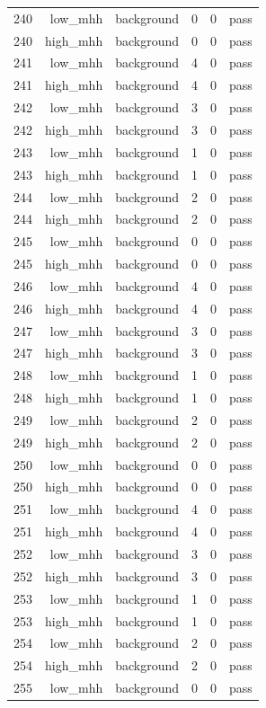 \begin{table}[htbp]
{\begin{tabular}{lrrrrr}
240 & low\_mhh & background & 0 & 0 & pass \\
240 & high\_mhh & background & 0 & 0 & pass \\
241 & low\_mhh & background & 4 & 0 & pass \\
241 & high\_mhh & background & 4 & 0 & pass \\
242 & low\_mhh & background & 3 & 0 & pass \\
242 & high\_mhh & background & 3 & 0 & pass \\
243 & low\_mhh & background & 1 & 0 & pass \\
243 & high\_mhh & background & 1 & 0 & pass \\
244 & low\_mhh & background & 2 & 0 & pass \\
244 & high\_mhh & background & 2 & 0 & pass \\
245 & low\_mhh & background & 0 & 0 & pass \\
245 & high\_mhh & background & 0 & 0 & pass \\
246 & low\_mhh & background & 4 & 0 & pass \\
246 & high\_mhh & background & 4 & 0 & pass \\
247 & low\_mhh & background & 3 & 0 & pass \\
247 & high\_mhh & background & 3 & 0 & pass \\
248 & low\_mhh & background & 1 & 0 & pass \\
248 & high\_mhh & background & 1 & 0 & pass \\
249 & low\_mhh & background & 2 & 0 & pass \\
249 & high\_mhh & background & 2 & 0 & pass \\
250 & low\_mhh & background & 0 & 0 & pass \\
250 & high\_mhh & background & 0 & 0 & pass \\
251 & low\_mhh & background & 4 & 0 & pass \\
251 & high\_mhh & background & 4 & 0 & pass \\
252 & low\_mhh & background & 3 & 0 & pass \\
252 & high\_mhh & background & 3 & 0 & pass \\
253 & low\_mhh & background & 1 & 0 & pass \\
253 & high\_mhh & background & 1 & 0 & pass \\
254 & low\_mhh & background & 2 & 0 & pass \\
254 & high\_mhh & background & 2 & 0 & pass \\
255 & low\_mhh & background & 0 & 0 & pass \\

\end{tabular}}
\end{table}
